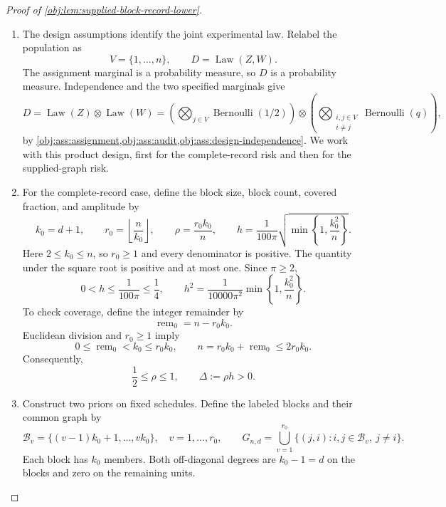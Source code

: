 \documentclass[11pt]{article}
\begin{document}
\begin{proof}[Proof of \cref{obj:lem:supplied-block-record-lower}]
\begin{enumerate}
\item The design assumptions identify the joint experimental law. Relabel the population as
\[
V=\{1,\ldots,n\},
\qquad
D=\operatorname{Law}(Z,W).
\]
The assignment marginal is a probability measure, so \(D\) is a probability measure. Independence and the two specified marginals give
\[
D
=
\operatorname{Law}(Z)\otimes\operatorname{Law}(W)
=
\left(\bigotimes_{j\in V}\operatorname{Bernoulli}(1/2)\right)
\otimes
\left(\bigotimes_{\substack{i,j\in V\\i\ne j}}
\operatorname{Bernoulli}(q)\right),
\]
by \cref{obj:ass:assignment,obj:ass:audit,obj:ass:design-independence}.
We work with this product design, first for the complete-record risk and then for the supplied-graph risk.

\item For the complete-record case, define the block size, block count, covered fraction, and amplitude by
\[
k_0=d+1,
\qquad
r_0=\left\lfloor\frac{n}{k_0}\right\rfloor,
\qquad
\rho=\frac{r_0k_0}{n},
\qquad
h=\frac{1}{100\pi}
\sqrt{\min\left\{1,\frac{k_0^2}{n}\right\}}.
\]
Here \(2\le k_0\le n\), so \(r_0\ge1\) and every denominator is positive. The quantity under the square root is positive and at most one. Since \(\pi\ge2\),
\[
0<h\le\frac{1}{100\pi}\le\frac14,
\qquad
h^2=
\frac{1}{10000\pi^2}
\min\left\{1,\frac{k_0^2}{n}\right\}.
\]
To check coverage, define the integer remainder by
\[
\operatorname{rem}_0=n-r_0k_0.
\]
Euclidean division and \(r_0\ge1\) imply
\[
0\le\operatorname{rem}_0<k_0\le r_0k_0,
\qquad
n=r_0k_0+\operatorname{rem}_0\le2r_0k_0.
\]
Consequently,
\[
\frac12\le\rho\le1,
\qquad
\Delta:=\rho h>0.
\]

\item Construct two priors on fixed schedules. Define the labeled blocks and their common graph by
\[
\mathcal B_v=\{(v-1)k_0+1,\ldots,vk_0\},
\quad v=1,\ldots,r_0,
\qquad
G_{n,d}
=
\bigcup_{v=1}^{r_0}
\{(j,i):i,j\in\mathcal B_v,\ j\ne i\}.
\]
Each block has \(k_0\) members. Both off-diagonal degrees are \(k_0-1=d\) on the blocks and zero on the remaining units.


\end{enumerate}
\end{proof}
\end{document}
